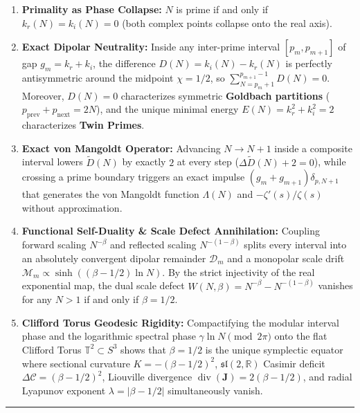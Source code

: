 \documentclass[
  11pt,
]{article}
\providecommand{\tightlist}{%
  \setlength{\itemsep}{0pt}\setlength{\parskip}{0pt}}
\begin{document}
\begin{enumerate}
\def\labelenumi{\arabic{enumi}.}
\tightlist
\item
  \textbf{Primality as Phase Collapse:} \(N\) is prime if and only if
  \(k_r(N) = k_i(N) = 0\) (both complex points collapse onto the real
  axis).
\item
  \textbf{Exact Dipolar Neutrality:} Inside any inter-prime interval
  \([p_m, p_{m+1}]\) of gap \(g_m = k_r + k_i\), the difference
  \(D(N) = k_i(N) - k_r(N)\) is perfectly antisymmetric around the
  midpoint \(\chi = 1/2\), so \(\sum_{N=p_m+1}^{p_{m+1}-1} D(N) = 0\).
  Moreover, \(D(N) = 0\) characterizes symmetric \textbf{Goldbach
  partitions} (\(p_{\text{prev}} + p_{\text{next}} = 2N\)), and the
  unique minimal energy \(E(N) = k_r^2 + k_i^2 = 2\) characterizes
  \textbf{Twin Primes}.
\item
  \textbf{Exact von Mangoldt Operator:} Advancing \(N \to N + 1\) inside
  a composite interval lowers \(\widetilde{D}(N)\) by exactly \(2\) at
  every step (\(\Delta \widetilde{D}(N) + 2 = 0\)), while crossing a
  prime boundary triggers an exact impulse
  \((g_m + g_{m+1})\delta_{p, N+1}\) that generates the von Mangoldt
  function \(\Lambda(N)\) and \(-\zeta'(s)/\zeta(s)\) without
  approximation.
\item
  \textbf{Functional Self-Duality \& Scale Defect Annihilation:}
  Coupling forward scaling \(N^{-\beta}\) and reflected scaling
  \(N^{-(1-\beta)}\) splits every interval into an absolutely convergent
  dipolar remainder \(\mathcal{D}_m\) and a monopolar scale drift
  \(\mathcal{M}_m \propto \sinh((\beta - 1/2)\ln N)\). By the strict
  injectivity of the real exponential map, the dual scale defect
  \(W(N, \beta) = N^{-\beta} - N^{-(1-\beta)}\) vanishes for any
  \(N > 1\) if and only if \(\beta = 1/2\).
\item
  \textbf{Clifford Torus Geodesic Rigidity:} Compactifying the modular
  interval phase and the logarithmic spectral phase
  \(\gamma \ln N \pmod{2\pi}\) onto the flat Clifford Torus
  \(\mathbb{T}^2 \subset S^3\) shows that \(\beta = 1/2\) is the unique
  symplectic equator where sectional curvature \(K = -(\beta - 1/2)^2\),
  \(\mathfrak{sl}(2, \mathbb{R})\) Casimir deficit
  \(\Delta \mathcal{C} = (\beta - 1/2)^2\), Liouville divergence
  \(\operatorname{div}(\mathbf{J}) = 2(\beta - 1/2)\), and radial
  Lyapunov exponent \(\lambda = |\beta - 1/2|\) simultaneously vanish.
\end{enumerate}

\begin{center}\rule{0.5\linewidth}{0.5pt}\end{center}
\end{document}
